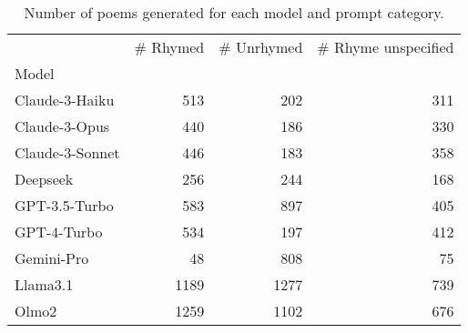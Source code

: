 \begin{table}[H]
  \centering
  \small
  \singlespacing
  \begin{tabular}{lrrr}
  \toprule
   & \# Rhymed & \# Unrhymed & \# Rhyme unspecified \\
  Model &  &  &  \\
  \midrule
  Claude-3-Haiku & 513 & 202 & 311 \\
  Claude-3-Opus & 440 & 186 & 330 \\
  Claude-3-Sonnet & 446 & 183 & 358 \\
  Deepseek & 256 & 244 & 168 \\
  GPT-3.5-Turbo & 583 & 897 & 405 \\
  GPT-4-Turbo & 534 & 197 & 412 \\
  Gemini-Pro & 48 & 808 & 75 \\
  Llama3.1 & 1189 & 1277 & 739 \\
  Olmo2 & 1259 & 1102 & 676 \\
  \bottomrule
  \end{tabular}
  \caption{Number of poems generated for each model and prompt category.}
  \label{tab:num_poems_models}
\end{table}